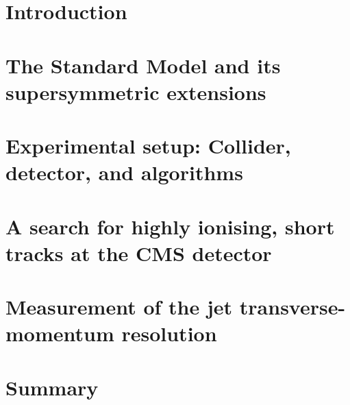 \documentclass[
twoside=true,
headsepline,     %
headings=normal,
open=right,
numbers=noenddot, %
a4paper,
11pt
]{scrreprt} %
\author{Teresa Lenz}
\begin{document}





\tableofcontents \cleardoublepage


\setcounter{page}{1}
\part{Introduction}  \label{part:Introduction}


\part{The Standard Model and its supersymmetric extensions} \label{part:Theory}


\part{Experimental setup: Collider, detector, and algorithms} \label{part:Experiment}


 \part{A search for highly ionising, short tracks at the CMS detector}  \label{part:analysis}
 
 
 
 
 
 
 
 
 
 

 \part{Measurement of the jet transverse-momentum resolution} \label{part:resolution}
 

\part{Summary} \label{part:Summary}


\newpage \thispagestyle{empty} \quad \cleardoublepage \thispagestyle{empty}
 \cleardoublepage  \appendix 
{} 
 

\cleardoublepage 
{}
{}




\part*{~}
\ohead{~}

\cleardoublepage

% 
\end{document}

